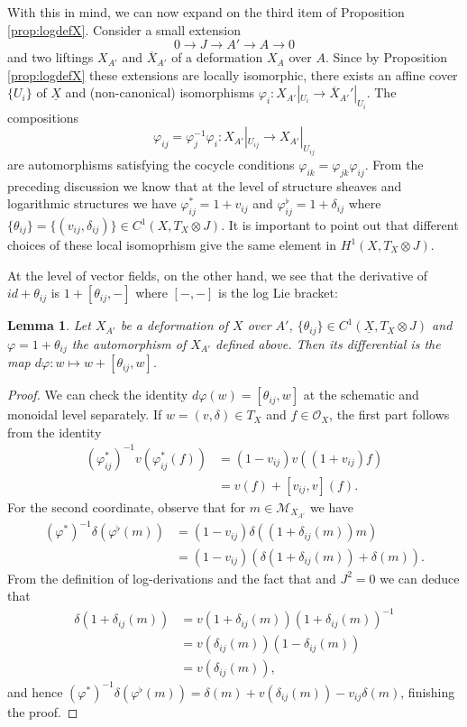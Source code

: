 \documentclass[reqno]{amsart}
\newcommand{\OO}{\mathcal{O}}
\newcommand{\M}{\mathcal{M}}
\newtheorem{lemma}[theorem]{Lemma}
\theoremstyle{definition}
\theoremstyle{named}
\begin{document}
With this in mind, we can now expand on the third item of Proposition \ref{prop:logdefX}.  
Consider a small extension $$0\rightarrow J\rightarrow A'\rightarrow A\rightarrow 0$$ and two liftings $X_{A'}$ and $\overline{X}_{A'}$ of a deformation $X_{A}$ over $A$. Since by Proposition \ref{prop:logdefX} these extensions are locally isomorphic, there exists an affine cover $\{U_i\}$ of $\underline{X}$ and (non-canonical) isomorphisms $\varphi_i:X_{A'}|_{U_i}\rightarrow\overline{X}_{A'}'|_{U_i}$. The compositions 
$$\varphi_{ij} = \varphi^{-1}_j\varphi_i: X_{A'}|_{U_{ij}}\rightarrow X_{A'}|_{U_{ij}}$$ 
are automorphisms satisfying the cocycle conditions $\varphi_{ik}=\varphi_{jk}\varphi_{ij}$. From the preceding discussion we know that at the level of structure sheaves and logarithmic structures we have $\varphi_{ij}^\ast = 1 + v_{ij}$ and $\varphi_{ij}^\flat = 1 + \delta_{ij}$ where $\{\theta_{ij}\}=\{(v_{ij},\delta_{ij})\}\in C^1(X,T_X\otimes J)$. It is important to point out that different choices of these local isomoprhism give the same element in $H^1(X,T_X\otimes J)$.


At the level of vector fields, on the other hand, we see that the derivative of $id+\theta_{ij}$ is $1 + [\theta_{ij},-]$ where $[-,-]$ is the log Lie bracket:

\begin{lemma} \label{lemma:Liederivative} Let $X_{A'}$ be a deformation of $X$ over $A'$, $\{\theta_{ij}\}\in C^1(\underline{X},T_X\otimes J)$ and $\varphi=1+\theta_{ij}$ the automorphism of $X_{A'}$ defined above. Then its differential is the map $d\varphi:w\mapsto w+[\theta_{ij},w]$. 
\end{lemma}

\begin{proof} We can check the identity $d\varphi(w)=[\theta_{ij},w]$ at the schematic and monoidal level separately. If $w=(v,\delta)\in T_X$ and $f\in \OO_X$, the first part follows from the identity
\begin{align*}(\varphi_{ij}^\ast)^{-1}v(\varphi^\ast_{ij}(f)) &= (1-v_{ij})v((1+v_{ij})f)\\ 
&= v(f) + [v_{ij},v](f).
\end{align*}
For the second coordinate, observe that for $m\in \M_{X_{A'}}$ we have
\begin{align*}
(\varphi^\ast)^{-1}\delta(\varphi^{\flat}(m) )&= (1-v_{ij})\delta((1+\delta_{ij}(m))m) \\
&=(1-v_{ij}) (\delta(1+\delta_{ij}(m))+\delta(m)).
\end{align*}
From the definition of log-derivations and the fact that and $J^2=0$ we can deduce that \begin{align*}
    \delta(1+\delta_{ij}(m))&=v(1+\delta_{ij}(m))(1+\delta_{ij}(m))^{-1}\\
    &=v(\delta_{ij}(m))(1-\delta_{ij}(m))\\
    &=v(\delta_{ij}(m)),
\end{align*} 
and hence 
$(\varphi^\ast)^{-1}\delta(\varphi^{\flat}(m) )=\delta(m)+v(\delta_{ij}(m))-v_{ij}\delta(m)$, finishing the proof.
\end{proof}
\end{document}
